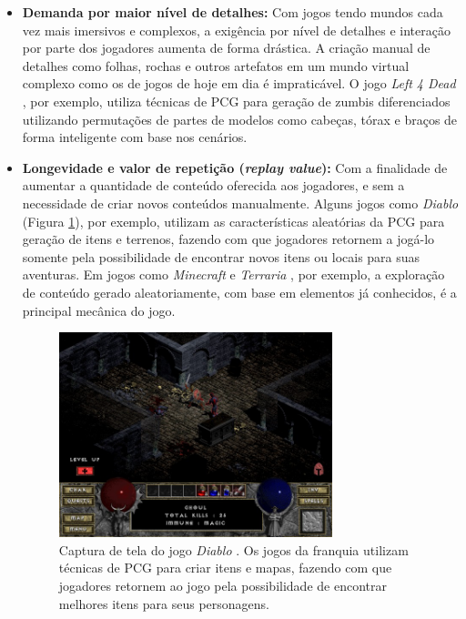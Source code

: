 \begin{itemize}[leftmargin=1.25\parindent]
    \item \textbf{Demanda por maior nível de detalhes:} Com jogos tendo mundos cada vez mais imersivos e complexos, a exigência por nível de detalhes e interação por parte dos jogadores aumenta de forma drástica. A criação manual de detalhes como folhas, rochas e outros artefatos em um mundo virtual complexo como os de jogos de hoje em dia é impraticável. O jogo \emph{Left 4 Dead} \cite{game:left4dead}, por exemplo, utiliza técnicas de PCG para geração de zumbis diferenciados utilizando permutações de partes de modelos como cabeças, tórax e braços de forma inteligente com base nos cenários.
    \item \textbf{Longevidade e valor de repetição (\emph{replay value}):} Com a finalidade de aumentar a quantidade de conteúdo oferecida aos jogadores, e sem a necessidade de criar novos conteúdos manualmente. Alguns jogos como \emph{Diablo} \cite{game:diablo} (Figura \ref{fig:game_diablo}), por exemplo, utilizam as características aleatórias da PCG para geração de itens e terrenos, fazendo com que jogadores retornem a jogá-lo somente pela possibilidade de encontrar novos itens ou locais para suas aventuras. Em jogos como \emph{Minecraft} \cite{game:minecraft} e \emph{Terraria} \cite{game:terraria}, por exemplo, a exploração de conteúdo gerado aleatoriamente, com base em elementos já conhecidos, é a principal mecânica do jogo.
    
    \begin{figure}[htb]
    	\begin{center}
    		\includegraphics[width=0.75\textwidth]{Imagens/game_diablo.jpg}
    		\caption{Captura de tela do jogo \emph{Diablo} \cite{game:diablo}. Os jogos da franquia utilizam técnicas de PCG para criar itens e mapas, fazendo com que jogadores retornem ao jogo pela possibilidade de encontrar melhores itens para seus personagens.}
    		\label{fig:game_diablo}
    	\end{center}
    \end{figure}
    

\end{itemize}
